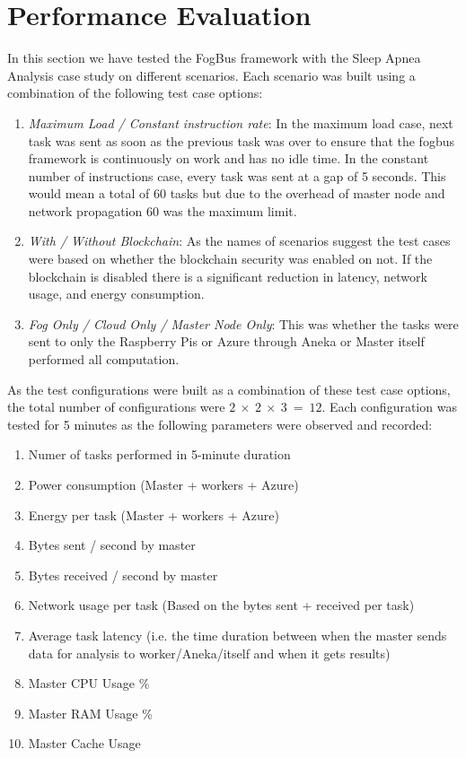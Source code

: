\documentclass[AMA,STIX1COL]{WileyNJD-v2}
\begin{document}
\section{Performance Evaluation}

In this section we have tested the FogBus framework with the Sleep Apnea Analysis case study on different scenarios. Each scenario was built using a combination of the following test case options:
\begin{enumerate}
\item \textit{Maximum Load / Constant instruction rate}:  In the maximum load case, next task was sent as soon as the previous task was over to ensure that the fogbus framework is continuously on work and has no idle time. In the constant number of instructions case, every task was sent at a gap of 5 seconds. This would mean a total of 60 tasks but due to the overhead of master node and network propagation 60 was the maximum limit.
\item  \textit{With / Without Blockchain}: As the names of scenarios suggest the test cases were based on whether the blockchain security was enabled on not. If the blockchain is disabled there is a significant reduction in latency, network usage, and energy consumption.
\item \textit{Fog Only / Cloud Only / Master Node Only}: This was whether the tasks were sent to only the Raspberry Pis or Azure through Aneka or Master itself performed all computation.
\end{enumerate}
As the test configurations were built as a combination of these test case options, the total number of configurations were $2 \  \times \ 2 \ \times \  3 \ =\  12$. Each configuration was tested for 5 minutes as the following parameters were observed and recorded:
\begin{enumerate}
\item Numer of tasks performed in 5-minute duration
\item Power consumption (Master + workers + Azure)
\item Energy per task (Master + workers + Azure)
\item Bytes sent / second by master
\item Bytes received / second by master
\item Network usage per task (Based on the bytes sent + received per task)
\item Average task latency (i.e. the time duration between when the master sends data for analysis to worker/Aneka/itself and when it gets results)
\item Master CPU Usage \%
\item Master RAM Usage \%
\item Master Cache Usage
\end{enumerate}
\end{document}
